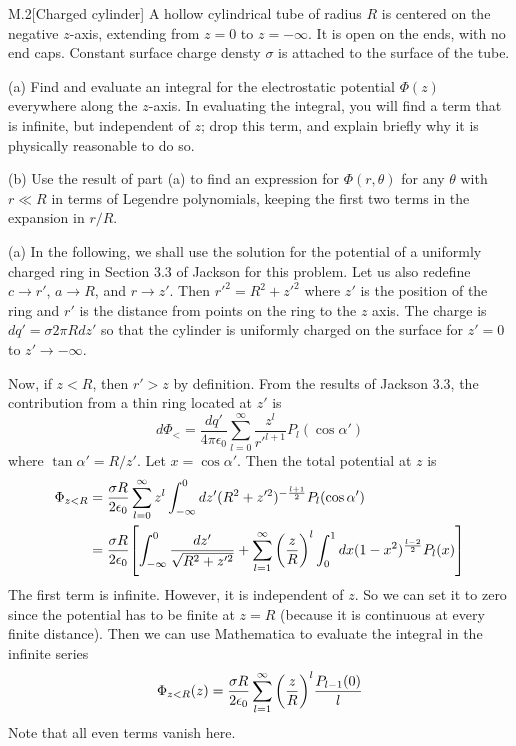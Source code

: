 \documentclass[12pt]{article}
\begin{document}
\begin{problem}{M.2}[Charged cylinder]
A hollow cylindrical tube of radius $R$ is centered on the negative $z$-axis,
extending from $z=0$ to $z=-\infty$. It is open on the ends, with no end caps.
Constant surface charge densty $\sigma$ is attached to the surface of the tube.

(a) Find and evaluate an integral for the electrostatic potential $\Phi(z)$
everywhere along the $z$-axis. In evaluating the integral, you will find a term
that is infinite, but independent of $z$; drop this term, and explain briefly
why it is physically reasonable to do so.

(b) Use the result of part (a) to find an expression for $\Phi(r,\theta)$ for
any $\theta$ with $r\ll R$ in terms of Legendre polynomials, keeping the first
two terms in the expansion in $r /R$.
\begin{solution}
(a) In the following, we shall use the solution for the potential of a uniformly
charged ring in Section 3.3 of Jackson for this problem. Let us also redefine
$c\to r'$, $a\to R$, and $r\to z'$. Then $r'^2=R^2+z'^2$ where $z'$ is the
position of the ring and $r'$ is the distance from points on the ring to the $z$
axis. The charge is $dq'=\sigma 2\pi Rdz'$ so that the cylinder is uniformly
charged on the surface for $z'=0$ to $z'\to-\infty$.

Now, if $z<R$, then $r'>z$ by definition. From the results of Jackson 3.3, the 
contribution from a thin ring located at $z'$ is
\begin{equation}
    d\Phi_<=\frac{dq'}{4\pi\epsilon_0}\sum_{l=0}^\infty
        \frac{z^l}{r'^{l+1}}P_l(\cos\alpha') 
\end{equation}
where $\tan\alpha'=R /z'$. Let $x=\cos\alpha'$. Then the 
total potential at $z$ is
\begin{align}
    \Phi_{z<R}
    &=\frac{\sigma R}{2\epsilon_0}\sum_{l=0}^\infty
    z^l\int_{-\infty}^0dz'(R^2+z'^2)^{-\frac{l+1}{2}}P_l(\cos\alpha')\notag\\
    &=\frac{\sigma R}{2\epsilon_0}\qty[
        \int_{-\infty}^0\frac{dz'}{\sqrt{R^2+z'^2}}
        +\sum_{l=1}^\infty\qty(\frac{z}{R})^l\int_0^1dx(1-x^2)^{\frac{l-2}{2}}
        P_l(x)
    ] 
\end{align}
The first term is infinite. However, it is independent of $z$. So we can set it 
to zero since the potential has to be finite at $z=R$ (because it is continuous
at every finite distance). Then we can use Mathematica to evaluate the integral
in the infinite series
\begin{equation}
    \Phi_{z<R}(z)=\frac{\sigma
    R}{2\epsilon_0}\sum_{l=1}^\infty\qty(\frac{z}{R})^l\frac{P_{l-1}(0)}{l}
\end{equation}
Note that all even terms vanish here.


\end{solution}
\end{problem}
\end{document}
